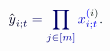 \documentclass[12pt]{article}
\begin{document}
\makeatletter
\renewcommand*{\@textcolor}[3]{%
  \protect\leavevmode
  \begingroup
    \color#1{#2}#3%
  \endgroup
}
\makeatother
\begin{displaymath}
{\mathcolor[RGB]{0,0,15}{\hat { \mathcolor[RGB]{0,0,30}{y} } }} _ { \mathcolor[RGB]{0,0,45}{i} \mathcolor[RGB]{0,0,60}{;} \mathcolor[RGB]{0,0,75}{t} } \mathcolor[RGB]{0,0,90}{=} \mathcolor[RGB]{0,0,105}{\prod} _ { \mathcolor[RGB]{0,0,120}{j} \mathcolor[RGB]{0,0,135}{\in} \mathcolor[RGB]{0,0,150}{[} \mathcolor[RGB]{0,0,165}{m} \mathcolor[RGB]{0,0,180}{]} } \mathcolor[RGB]{0,0,195}{x} _ { \mathcolor[RGB]{0,0,210}{i} \mathcolor[RGB]{0,0,225}{;} \mathcolor[RGB]{0,0,240}{t} } ^ { \mathcolor[RGB]{0,0,255}{(} \mathcolor[RGB]{0,15,0}{i} \mathcolor[RGB]{0,15,15}{)} } \mathcolor[RGB]{0,15,30}{.}
\end{displaymath}
\end{document}
